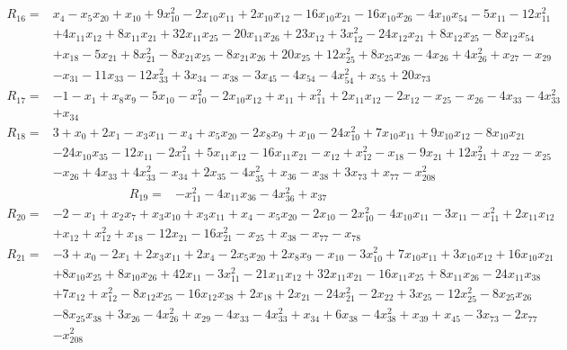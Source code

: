 \begin{align*}
 R_{16}={}&x_{4} -x_{5}x_{20} +x_{10} +9x_{10}^{2} -2x_{10}x_{11} +2x_{10}x_{12} -16x_{10}x_{21} -16x_{10}x_{26} -4x_{10}x_{54} -5x_{11} -12x_{11}^{2}\\
 &+4x_{11}x_{12} +8x_{11}x_{21} +32x_{11}x_{25} -20x_{11}x_{26} +23x_{12} +3x_{12}^{2} -24x_{12}x_{21} +8x_{12}x_{25} -8x_{12}x_{54}\\
 &+x_{18} -5x_{21} +8x_{21}^{2} -8x_{21}x_{25} -8x_{21}x_{26} +20x_{25} +12x_{25}^{2} +8x_{25}x_{26} -4x_{26} +4x_{26}^{2} +x_{27} -x_{29}\\
 &-x_{31} -11x_{33} -12x_{33}^{2} +3x_{34} -x_{38} -3x_{45} -4x_{54} -4x_{54}^{2} +x_{55} +20x_{73}
\end{align*}
\begin{align*}
 R_{17}={}&-1 -x_{1} +x_{8}x_{9} -5x_{10} -x_{10}^{2} -2x_{10}x_{12} +x_{11} +x_{11}^{2} +2x_{11}x_{12} -2x_{12} -x_{25} -x_{26} -4x_{33} -4x_{33}^{2}\\
 &+x_{34}
\end{align*}
\begin{align*}
 R_{18}={}&3 +x_{0} +2x_{1} -x_{3}x_{11} -x_{4} +x_{5}x_{20} -2x_{8}x_{9} +x_{10} -24x_{10}^{2} +7x_{10}x_{11} +9x_{10}x_{12} -8x_{10}x_{21}\\
 &-24x_{10}x_{35} -12x_{11} -2x_{11}^{2} +5x_{11}x_{12} -16x_{11}x_{21} -x_{12} +x_{12}^{2} -x_{18} -9x_{21} +12x_{21}^{2} +x_{22} -x_{25}\\
 &-x_{26} +4x_{33} +4x_{33}^{2} -x_{34} +2x_{35} -4x_{35}^{2} +x_{36} -x_{38} +3x_{73} +x_{77} -x_{208}^{2}
\end{align*}
\begin{align*}
 R_{19}={}&-x_{11}^{2} -4x_{11}x_{36} -4x_{36}^{2} +x_{37}
\end{align*}
\begin{align*}
 R_{20}={}&-2 -x_{1} +x_{2}x_{7} +x_{3}x_{10} +x_{3}x_{11} +x_{4} -x_{5}x_{20} -2x_{10} -2x_{10}^{2} -4x_{10}x_{11} -3x_{11} -x_{11}^{2} +2x_{11}x_{12}\\
 &+x_{12} +x_{12}^{2} +x_{18} -12x_{21} -16x_{21}^{2} -x_{25} +x_{38} -x_{77} -x_{78}
\end{align*}
\begin{align*}
 R_{21}={}&-3 +x_{0} -2x_{1} +2x_{3}x_{11} +2x_{4} -2x_{5}x_{20} +2x_{8}x_{9} -x_{10} -3x_{10}^{2} +7x_{10}x_{11} +3x_{10}x_{12} +16x_{10}x_{21}\\
 &+8x_{10}x_{25} +8x_{10}x_{26} +42x_{11} -3x_{11}^{2} -21x_{11}x_{12} +32x_{11}x_{21} -16x_{11}x_{25} +8x_{11}x_{26} -24x_{11}x_{38}\\
 &+7x_{12} +x_{12}^{2} -8x_{12}x_{25} -16x_{12}x_{38} +2x_{18} +2x_{21} -24x_{21}^{2} -2x_{22} +3x_{25} -12x_{25}^{2} -8x_{25}x_{26}\\
 &-8x_{25}x_{38} +3x_{26} -4x_{26}^{2} +x_{29} -4x_{33} -4x_{33}^{2} +x_{34} +6x_{38} -4x_{38}^{2} +x_{39} +x_{45} -3x_{73} -2x_{77}\\
 &-x_{208}^{2}
\end{align*}

